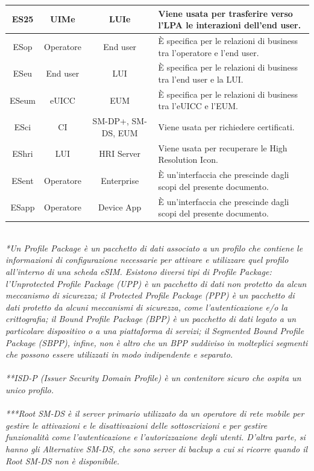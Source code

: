 \documentclass[10pt, oneside]{book}
\begin{document}
\begin{table}[h!]
\begin{center}
\begin{tabularx}{\textwidth}{|c|c|c|X|}
\hline
ES25 & UIMe & LUIe & Viene usata per trasferire verso l'LPA le interazioni dell'end user.\\
\hline
ESop & Operatore & End user & È specifica per le relazioni di business tra l'operatore e l'end user.\\
\hline
ESeu & End user & LUI & È specifica per le relazioni di business tra l'end user e la LUI.\\
\hline
ESeum & eUICC & EUM & È specifica per le relazioni di business tra l'eUICC e l'EUM.\\
\hline
ESci & CI & SM-DP+, SM-DS, EUM & Viene usata per richiedere certificati.\\
\hline
EShri & LUI & HRI Server & Viene usata per recuperare le High Resolution Icon.\\
\hline
ESent & Operatore & Enterprise & È un'interfaccia che prescinde dagli scopi del presente documento.\\
\hline
ESapp & Operatore & Device App & È un'interfaccia che prescinde dagli scopi del presente documento.\\
\hline
\end{tabularx}
\end{center}
\end{table}
\\\textit{*Un Profile Package è un pacchetto di dati associato a un profilo che contiene le informazioni di configurazione necessarie per attivare e utilizzare quel profilo all'interno di una scheda eSIM. Esistono diversi tipi di Profile Package: l'Unprotected Profile Package (UPP) è un pacchetto di dati non protetto da alcun meccanismo di sicurezza; il Protected Profile Package (PPP) è un pacchetto di dati protetto da alcuni meccanismi di sicurezza, come l'autenticazione e/o la crittografia; il Bound Profile Package (BPP) è un pacchetto di dati legato a un particolare dispositivo o a una piattaforma di servizi; il Segmented Bound Profile Package (SBPP), infine, non è altro che un BPP suddiviso in molteplici segmenti che possono essere utilizzati in modo indipendente e separato.}\\ \\
\textit{**ISD-P (Issuer Security Domain Profile) è un contenitore sicuro che ospita un unico profilo.}\\ \\
\textit{***Root SM-DS è il server primario utilizzato da un operatore di rete mobile per gestire le attivazioni e le disattivazioni delle sottoscrizioni e per gestire funzionalità come l'autenticazione e l'autorizzazione degli utenti. D'altra parte, si hanno gli Alternative SM-DS, che sono server di backup a cui si ricorre quando il Root SM-DS non è disponibile.}
\end{document}
